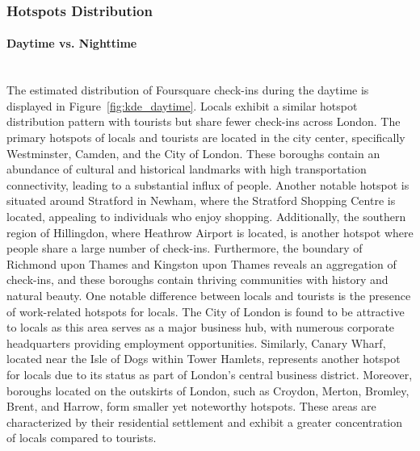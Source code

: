 \documentclass{article}
\newcommand{\subsubsubsection}[1]{\paragraph{#1}\mbox{}\\}
\theoremstyle{remark}
\begin{document}
\subsubsection{Hotspots Distribution} \label{hotspots}

\subsubsubsection{Daytime vs. Nighttime}
The estimated distribution of Foursquare check-ins during the daytime is displayed in Figure~\ref{fig:kde_daytime}. Locals exhibit a similar hotspot distribution pattern with tourists but share fewer check-ins across London. The primary hotspots of locals and tourists are located in the city center, specifically Westminster, Camden, and the City of London. These boroughs contain an abundance of cultural and historical landmarks with high transportation connectivity, leading to a substantial influx of people. Another notable hotspot is situated around Stratford in Newham, where the Stratford Shopping Centre is located, appealing to individuals who enjoy shopping. Additionally, the southern region of Hillingdon, where Heathrow Airport is located, is another hotspot where people share a large number of check-ins. Furthermore, the boundary of Richmond upon Thames and Kingston upon Thames reveals an aggregation of check-ins, and these boroughs contain thriving communities with history and natural beauty. One notable difference between locals and tourists is the presence of work-related hotspots for locals. The City of London is found to be attractive to locals as this area serves as a major business hub, with numerous corporate headquarters providing employment opportunities. Similarly, Canary Wharf, located near the Isle of Dogs within Tower Hamlets, represents another hotspot for locals due to its status as part of London's central business district. Moreover, boroughs located on the outskirts of London, such as Croydon, Merton, Bromley, Brent, and Harrow, form smaller yet noteworthy hotspots. These areas are characterized by their residential settlement and exhibit a greater concentration of locals compared to tourists.
\end{document}
